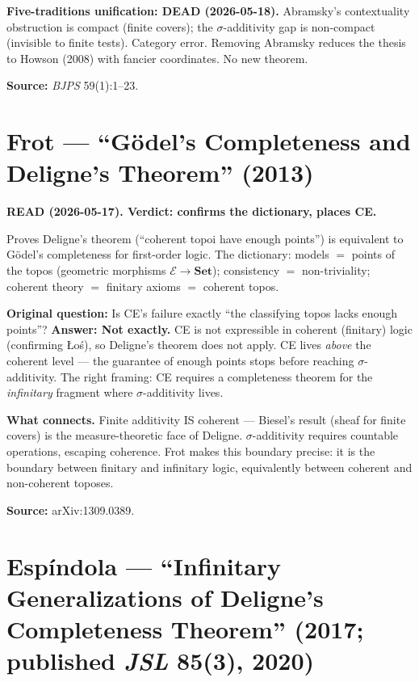 \medskip\noindent
\textbf{Five-traditions unification: DEAD (2026-05-18).}
Abramsky's contextuality obstruction is compact (finite covers);
the $\sigma$-additivity gap is non-compact (invisible to finite
tests).  Category error.  Removing Abramsky reduces the thesis to
Howson (2008) with fancier coordinates.  No new theorem.

\medskip\noindent
\textbf{Source:} \emph{BJPS} 59(1):1--23.

\section{Frot --- ``G\"{o}del's Completeness and Deligne's Theorem''
(2013)}

\textbf{READ (2026-05-17).  Verdict: confirms the dictionary,
places CE.}

\medskip\noindent
Proves Deligne's theorem (``coherent topoi have enough points'')
is equivalent to G\"{o}del's completeness for first-order logic.
The dictionary: models $=$ points of the topos (geometric morphisms
$\mathcal{E} \to \mathbf{Set}$); consistency $=$ non-triviality;
coherent theory $=$ finitary axioms $=$ coherent topos.

\medskip\noindent
\textbf{Original question:} Is CE's failure exactly ``the
classifying topos lacks enough points''?  \textbf{Answer: Not
exactly.}  CE is not expressible in coherent (finitary) logic
(confirming \L o\'{s}), so Deligne's theorem does not apply.  CE
lives \emph{above} the coherent level --- the guarantee of enough
points stops before reaching $\sigma$-additivity.  The right
framing: CE requires a completeness theorem for the
\emph{infinitary} fragment where $\sigma$-additivity lives.

\medskip\noindent
\textbf{What connects.}  Finite additivity IS coherent ---
Biesel's result (sheaf for finite covers) is the measure-theoretic
face of Deligne.  $\sigma$-additivity requires countable
operations, escaping coherence.  Frot makes this boundary precise:
it is the boundary between finitary and infinitary logic,
equivalently between coherent and non-coherent toposes.

\medskip\noindent
\textbf{Source:} arXiv:1309.0389.

\section{Esp\'{i}ndola --- ``Infinitary Generalizations of Deligne's
Completeness Theorem'' (2017; published \emph{JSL} 85(3), 2020)}

